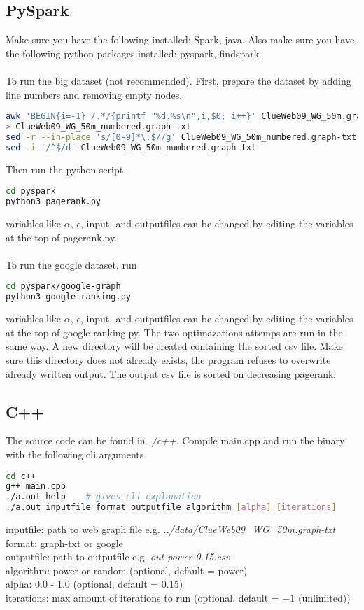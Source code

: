 \documentclass{article}
\begin{document}
\subsection{PySpark}
Make sure you have the following installed: Spark, java. 
Also make sure you have the following python packages installed: pyspark, findspark
\\\\
To run the big dataset (not recommended).
First, prepare the dataset by adding line numbers and removing empty nodes.
\begin{lstlisting}[language=sh]
awk 'BEGIN{i=-1} /.*/{printf "%d.%s\n",i,$0; i++}' ClueWeb09_WG_50m.graph-txt 
> ClueWeb09_WG_50m_numbered.graph-txt 
sed -r --in-place 's/[0-9]*\.$//g' ClueWeb09_WG_50m_numbered.graph-txt 
sed -i '/^$/d' ClueWeb09_WG_50m_numbered.graph-txt
\end{lstlisting}
Then run the python script.
\begin{lstlisting}[language=sh]
cd pyspark
python3 pagerank.py
\end{lstlisting}
variables like $\alpha$, $\epsilon$, input- and outputfiles can be changed by editing the variables at the top of pagerank.py.
\\\\
To run the google dataset, run
\begin{lstlisting}[language=sh]
cd pyspark/google-graph
python3 google-ranking.py
\end{lstlisting}
variables like $\alpha$, $\epsilon$, input- and outputfiles can be changed by editing the variables at the top of google-ranking.py.
The two optimazations attemps are run in the same way. A new directory will be created containing the sorted csv file. Make sure this directory does not already exists, the program refuses to overwrite already written output.
The output csv file is sorted on decreasing pagerank.

\subsection{C++}
The source code can be found in \textit{./c++}. Compile main.cpp and run the binary with the following cli arguments
\begin{lstlisting}[language=sh]
cd c++
g++ main.cpp
./a.out help    # gives cli explanation
./a.out inputfile format outputfile algorithm [alpha] [iterations]
\end{lstlisting}
inputfile: path to web graph file e.g. \textit{../data/ClueWeb09\_WG\_50m.graph-txt} \\
format: graph-txt or google \\
outputfile: path to outputfile e.g. \textit{out-power-0.15.csv}\\
algorithm: power or random (optional, default = power)\\
alpha: 0.0 - 1.0 (optional, default = 0.15)\\
iterations: max amount of iterations to run (optional, default = $-1$ (unlimited))
\end{document}
